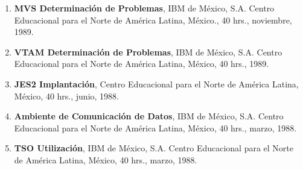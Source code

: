 \begin{enumerate}[itemsep=-1mm]
\item \textbf{MVS Determinación de Problemas}, IBM de México, S.A. Centro Educacional para el Norte de América Latina, México., 40 hrs., noviembre, 1989.

\item \textbf{VTAM Determinación de Problemas}, IBM de México, S.A. Centro Educacional para el Norte de América Latina, México, 40 hrs., 1989.

\item \textbf{JES2 Implantación}, Centro Educacional para el Norte de América Latina, México, 40 hrs., junio, 1988.

\item \textbf{Ambiente de Comunicación de Datos}, IBM de México, S.A. Centro Educacional para el Norte de América Latina, México, 40 hrs., marzo, 1988. 

\item \textbf{TSO Utilización}, IBM de México, S.A. Centro Educacional para el Norte de América Latina, México, 40 hrs., marzo, 1988.

\end{enumerate}



